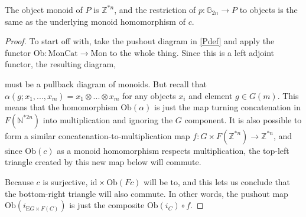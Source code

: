 \begin{prop}\label{Pobj} The object monoid of $P$ is $\mathbb{Z}^{*n}$, and the restriction of $p: \mathbb{G}_{2n} \to P$ to objects is the same as the underlying monoid homomorphism of $c$.
\end{prop}
\begin{proof}
To start off with, take the pushout diagram in \cref{Pdef} and apply the functor $\mathrm{Ob}: \mathrm{MonCat} \to \mathrm{Mon}$ to the whole thing. Since this is a left adjoint functor, the resulting diagram,
\begin{eq*}  \end{eq*}
must be a pullback diagram of monoids. But recall that $\alpha(g; x_1, ..., x_m) = x_1 \otimes ... \otimes x_m$ for any objects $x_i$ and element $g \in G(m)$. This means that the homomorphism $\mathrm{Ob}(\alpha)$ is just the map turning concatenation in $F(\mathbb{N}^{\ast 2n})$ into multiplication and ignoring the $G$ component. It is also possible to form a similar concatenation-to-multiplication map $f: G \times F(\mathbb{Z}^{\ast n}) \to \mathbb{Z}^{\ast n}$, and since $\mathrm{Ob}(c)$ as a monoid homomorphism respects multiplication, the top-left triangle created by this new map below will commute.
\begin{eq*}  \end{eq*}
Because $c$ is surjective, $\mathrm{id} \times \mathrm{Ob}(Fc)$ will be to, and this lets us conclude that the bottom-right triangle will also commute. In other words, the pushout map $\mathrm{Ob}(i_{\mathrm{E}G \times F(C)})$ is just the composite $\mathrm{Ob}(i_C) \circ f$. 


\end{proof}
